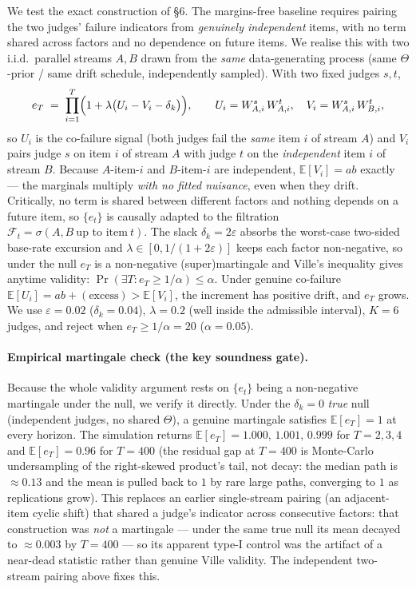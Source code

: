 \documentclass[11pt,a4paper]{article}
\begin{document}
We test the exact construction of \S6. The margins-free baseline requires
pairing the two judges' failure indicators from \emph{genuinely independent}
items, with no term shared across factors and no dependence on future items.
We realise this with two i.i.d.\ parallel streams $A,B$ drawn from the
\emph{same} data-generating process (same $\Theta$-prior / same drift schedule,
independently sampled). With two fixed judges $s,t$,
\begin{equation}
  e_T \;=\; \prod_{i=1}^{T}\Bigl(1 + \lambda\bigl(U_i - V_i - \delta_k\bigr)\Bigr),
  \qquad
  U_i = W^s_{A,i}\,W^t_{A,i},
  \quad
  V_i = W^s_{A,i}\,W^t_{B,i},
  \label{eq:eproc}
\end{equation}
so $U_i$ is the co-failure signal (both judges fail the \emph{same} item $i$ of
stream $A$) and $V_i$ pairs judge $s$ on item $i$ of stream $A$ with judge $t$
on the \emph{independent} item $i$ of stream $B$. Because $A$-item-$i$ and
$B$-item-$i$ are independent, $\mathbb E[V_i] = ab$ exactly --- the marginals
multiply \emph{with no fitted nuisance}, even when they drift. Critically, no
term is shared between different factors and nothing depends on a future item,
so $\{e_t\}$ is causally adapted to the filtration
$\mathcal F_t = \sigma(A,B\ \text{up to item}\ t)$. The slack $\delta_k =
2\varepsilon$ absorbs the worst-case two-sided base-rate excursion and $\lambda
\in [0, 1/(1+2\varepsilon)]$ keeps each factor non-negative, so under the null
$e_T$ is a non-negative (super)martingale and Ville's inequality gives anytime
validity: $\Pr(\exists T: e_T \ge 1/\alpha) \le \alpha$. Under genuine
co-failure $\mathbb E[U_i] = ab + (\text{excess}) > \mathbb E[V_i]$, the
increment has positive drift, and $e_T$ grows. We use $\varepsilon = 0.02$
($\delta_k = 0.04$), $\lambda = 0.2$ (well inside the admissible interval),
$K = 6$ judges, and reject when $e_T \ge 1/\alpha = 20$ ($\alpha = 0.05$).

\paragraph{Empirical martingale check (the key soundness gate).} Because the
whole validity argument rests on $\{e_t\}$ being a non-negative martingale under
the null, we verify it directly. Under the $\delta_k=0$ \emph{true} null
(independent judges, no shared $\Theta$), a genuine martingale satisfies
$\mathbb E[e_T]=1$ at every horizon. The simulation returns $\mathbb E[e_T] =
1.000,\,1.001,\,0.999$ for $T = 2,3,4$ and $\mathbb E[e_T] = 0.96$ for $T=400$
(the residual gap at $T=400$ is Monte-Carlo undersampling of the right-skewed
product's tail, not decay: the median path is $\approx 0.13$ and the mean is
pulled back to $1$ by rare large paths, converging to $1$ as replications grow).
This replaces an earlier single-stream pairing (an adjacent-item cyclic shift)
that shared a judge's indicator across consecutive factors: that construction
was \emph{not} a martingale --- under the same true null its mean decayed to
$\approx 0.003$ by $T=400$ --- so its apparent type-I control was the artifact
of a near-dead statistic rather than genuine Ville validity. The independent
two-stream pairing above fixes this.
\end{document}
